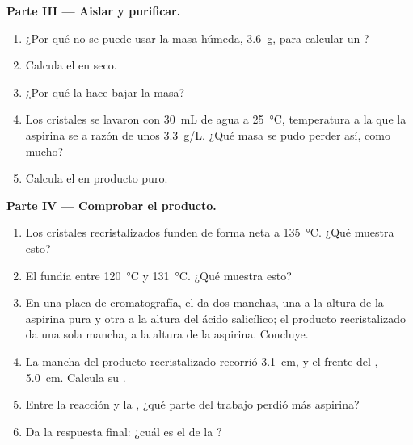 \begin{problem}
\medskip
\noindent\textbf{Parte III --- Aislar y purificar.}
\begin{enumerate}[resume]
  \item ¿Por qué no se puede usar la masa húmeda, \qty{3.6}{g}, para
        calcular un ?
  \item Calcula el  en  seco.
  \item ¿Por qué la  hace bajar la masa?
  \item Los cristales se lavaron con \qty{30}{mL} de agua a
        \qty{25}{\celsius}, temperatura a la que la aspirina se 
        a razón de unos \qty{3.3}{g/L}. ¿Qué masa se pudo perder así,
        como mucho?
  \item Calcula el  en producto puro.
\end{enumerate}

\medskip
\noindent\textbf{Parte IV --- Comprobar el producto.}
\begin{enumerate}[resume]
  \item Los cristales recristalizados funden de forma neta a
        \qty{135}{\celsius}. ¿Qué muestra esto?
  \item El  fundía entre \qty{120}{\celsius} y
        \qty{131}{\celsius}. ¿Qué muestra esto?
  \item En una placa de cromatografía, el  da dos
        manchas, una a la altura de la aspirina pura y otra a la altura
        del ácido salicílico; el producto recristalizado da una sola
        mancha, a la altura de la aspirina. Concluye.
  \item La mancha del producto recristalizado recorrió \qty{3.1}{cm}, y
        el frente del , \qty{5.0}{cm}. Calcula su .
  \item Entre la reacción y la , ¿qué parte del trabajo
        perdió más aspirina?
  \item Da la respuesta final: ¿cuál es el  de la ?
\end{enumerate}
\end{problem}
